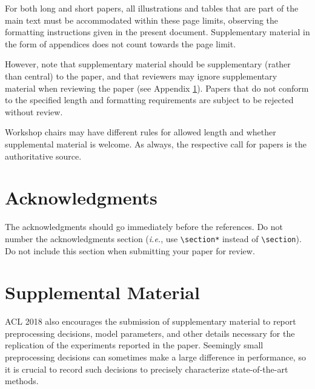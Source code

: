 \documentclass[11pt,a4paper]{article}
\begin{document}
For both long and short papers, all illustrations and tables that are part
of the main text must be accommodated within these page limits, observing
the formatting instructions given in the present document. Supplementary
material in the form of appendices does not count towards the page limit.

However, note that supplementary material should be supplementary
(rather than central) to the paper, and that reviewers may ignore
supplementary material when reviewing the paper (see Appendix
\ref{sec:supplemental}). Papers that do not conform to the specified
length and formatting requirements are subject to be rejected without
review.

Workshop chairs may have different rules for allowed length and
whether supplemental material is welcome. As always, the respective
call for papers is the authoritative source.

\section*{Acknowledgments}

The acknowledgments should go immediately before the references.  Do not number the acknowledgments section ({\em i.e.}, use \verb|\section*| instead of \verb|\section|). Do not include this section when submitting your paper for review.

%
%



\appendix

\section{Supplemental Material}
\label{sec:supplemental}
ACL 2018 also encourages the submission of supplementary material
to report preprocessing decisions, model parameters, and other details
necessary for the replication of the experiments reported in the 
paper. Seemingly small preprocessing decisions can sometimes make
a large difference in performance, so it is crucial to record such
decisions to precisely characterize state-of-the-art methods.
\end{document}
